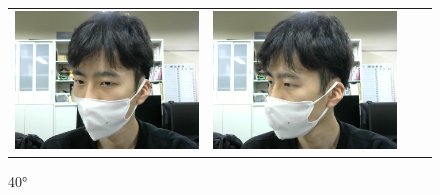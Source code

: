 \documentclass[]{jarticle}          %
\begin{document}
\begin{figure}[!ht]
  \begin{tabular}{cccc}
    \begin{minipage}[t]{0.25\hsize}
      \centering
      \includegraphics[keepaspectratio, scale=0.2]{figures/result/0mask.png}
      \caption{25°}
    \end{minipage} &
    \begin{minipage}[t]{0.25\hsize}
      \centering
      \includegraphics[keepaspectratio, scale=0.2]{figures/result/3mask.png}
      \caption{40°}
    \end{minipage}
    \begin{minipage}[t]{0.25\hsize}
      \centering

\end{minipage}
\end{tabular}
\end{figure}
\end{document}
